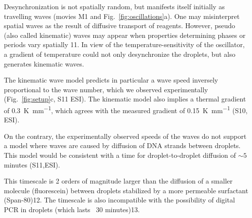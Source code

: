 \documentclass[prl,reprint, amsmath,amssymb,superscriptaddress]{revtex4-1}
\begin{document}
Desynchronization is not spatially random, but manifests itself initially as travelling waves (movies  M1 and Fig.~\ref{fig:oscillations}a). One may misinterpret spatial waves as the result of diffusive transport of reagents. However, pseudo (also called kinematic) waves may appear when properties determining phases or periods vary spatially 11. In view of the temperature-sensitivity of the oscillator, a gradient of temperature could not only desynchronize the droplets, but also generates kinematic waves. 

	The kinematic wave model predicts in particular a wave speed inversely proportional to the wave number, which we observed experimentally (Fig.~\ref{fig:setup}c, S11 ESI). The kinematic model also implies a thermal gradient of \SI{0.3}{\kelvin\per\milli\metre}, which agrees with the measured gradient of \SI{0.15}{\kelvin\per\milli\metre} (S10, ESI).
	
	On the contrary, the experimentally observed speeds of the waves do not support a model where waves are caused by diffusion of DNA strands between droplets. This model would be consistent with a time for droplet-to-droplet diffusion of $\sim 5$ minutes (S11,ESI). 
	
This timescale is 2 orders of magnitude larger than the diffusion of a smaller molecule (fluorescein) between droplets stabilized by a more permeable surfactant (Span-80)12. The timescale is also incompatible with the possibility of digital PCR in droplets (which lasts ~30 minutes)13.
\end{document}
